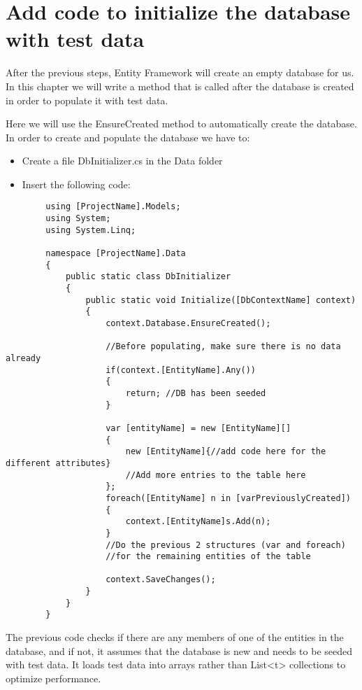 \documentclass{report}
\begin{document}
    \chapter{Add code to initialize the database with test data}
    After the previous steps, Entity Framework will create an empty database for us.
    In this chapter we will write a method that is called after the database is created
    in order to populate it with test data.

    Here we will use the EnsureCreated method to automatically create the database.
    In order to create and populate the database we have to:
    \begin{itemize}
        \item Create a file DbInitializer.cs in the Data folder
        \item Insert the following code:
    \end{itemize}

    \lstset{style=sharpc}
    \begin{lstlisting}
        using [ProjectName].Models;
        using System;
        using System.Linq;

        namespace [ProjectName].Data
        {
            public static class DbInitializer
            {
                public static void Initialize([DbContextName] context)
                {
                    context.Database.EnsureCreated();

                    //Before populating, make sure there is no data already
                    if(context.[EntityName].Any())
                    {
                        return; //DB has been seeded
                    }

                    var [entityName] = new [EntityName][]
                    {
                        new [EntityName]{//add code here for the different attributes}
                        //Add more entries to the table here
                    };
                    foreach([EntityName] n in [varPreviouslyCreated])
                    {
                        context.[EntityName]s.Add(n);
                    }
                    //Do the previous 2 structures (var and foreach)
                    //for the remaining entities of the table

                    context.SaveChanges();
                }
            }
        }
    \end{lstlisting}

    The previous code checks if there are any members of one of the
    entities in the database, and if not, it assumes that the database
    is new and needs to be seeded with test data. It loads test data
    into arrays rather than List<t> collections to optimize performance.
\end{document}
